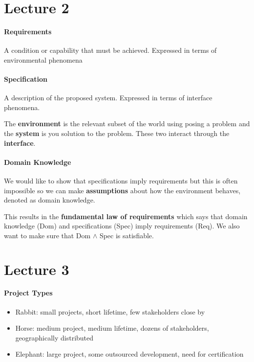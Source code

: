 \documentclass[12pt]{article}
\begin{document}
\section*{Lecture 2}
\label{sec:lecture_2}

\paragraph{Requirements} 
\label{par:requirements}
A condition or capability that must be achieved. Expressed in terms of environmental phenomena

\paragraph{Specification} 
\label{par:specification}
A description of the proposed system. Expressed in terms of interface phenomena. 

The \textbf{environment} is the relevant subset of the world using posing a problem and the \textbf{system} is you solution to the problem. These two interact through the \textbf{interface}. 

\paragraph{Domain Knowledge} 
\label{par:domain_knowledge}
We would like to show that specifications imply requirements but this is often impossible so we can make \textbf{assumptions} about how the environment behaves, denoted as domain knowledge. 

This results in the \textbf{fundamental law of requirements} which says that domain knowledge (Dom) and specifications (Spec) imply requirements (Req). We also want to make sure that Dom $\wedge$ Spec is satisfiable. 

\section*{Lecture 3}
\label{sec:lecture_3}
\paragraph{Project Types} 
\label{par:project_types}
\begin{itemize}
	\item Rabbit: small projects, short lifetime, few stakeholders close by
	\item Horse: medium project, medium lifetime, dozens of stakeholders, geographically distributed
	\item Elephant: large project, some outsourced development, need for certification
\end{itemize}
\end{document}
